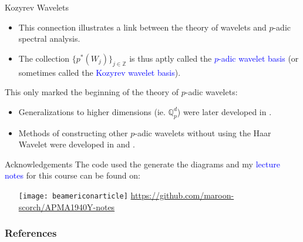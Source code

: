 \documentclass[hyperref, notheorems]{beamer}
\newcommand{\Zbb}{\mathbb{Z}}
\newcommand{\Qbb}{\mathbb{Q}}
\newcommand{\txtblue}{\textcolor{blue}}
\theoremstyle{definition}
\begin{document}
\begin{frame}{Kozyrev Wavelets}

\begin{itemize}
    \item This connection illustrates a link between the theory of wavelets and $p$-adic spectral analysis.
    \item The collection $\{p^*(W_j)\}_{j \in \Zbb}$ is thus aptly called the \txtblue{$p$-adic wavelet basis} (or sometimes called the \txtblue{Kozyrev wavelet basis}).
\end{itemize}

This only marked the beginning of the theory of $p$-adic wavelets:
\begin{itemize}
    \item Generalizations to higher dimensions (ie. $\Qbb^d_p$) were later developed in \cite{khrennikov2006padic}.
    \item Methods of constructing other $p$-adic wavelets without using the Haar Wavelet were developed in \cite{khrennikov_shelkovich_2009} and \cite{khrennikov_shelkovich_2010}.
\end{itemize}
\end{frame}

\begin{frame}{Acknowledgements}
    The code used the generate the diagrams and my \txtblue{lecture notes} for this course can be found on:
    \begin{itemize}
        \item[{\texttt{[image: beamericonarticle]}}] \url{https://github.com/maroon-scorch/APMA1940Y-notes}
    \end{itemize}
\end{frame}

\begin{frame}[allowframebreaks]
\frametitle{References}


\end{frame}
\end{document}
